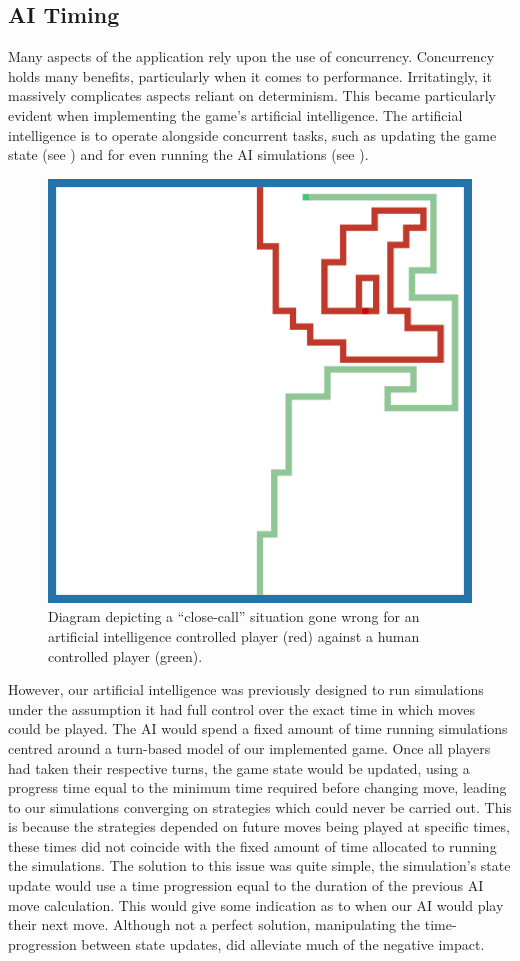 \documentclass{standalone}
\begin{document}
		\subsection{AI Timing} \label{sec:aiTiming}
			Many aspects of the application rely upon the use of concurrency. Concurrency holds many benefits, particularly when it comes to performance. Irritatingly, it massively complicates aspects reliant on determinism. This became particularly evident when implementing the game's artificial intelligence. The artificial intelligence is to operate alongside concurrent tasks, such as updating the game state (see ) and for even running the AI simulations (see ).

			\begin{figure}[!htbp]
				\centering
				\includegraphics[width=.8\textwidth]{resources/images/aiclosecall.png}
				\caption{Diagram depicting a \enquote{close-call} situation gone wrong for an artificial intelligence controlled player (red) against a human controlled player (green).}
			\end{figure}
			\FloatBarrier

			However, our artificial intelligence was previously designed to run simulations under the assumption it had full control over the exact time in which moves could be played. The AI would spend a fixed amount of time running simulations centred around a turn-based model of our implemented game. Once all players had taken their respective turns, the game state would be updated, using a progress time equal to the minimum time required before changing move, leading to our simulations converging on strategies which could never be carried out. This is because the strategies depended on future moves being played at specific times, these times did not coincide with the fixed amount of time allocated to running the simulations. The solution to this issue was quite simple, the simulation's state update would use a time progression equal to the duration of the previous AI move calculation. This would give some indication as to when our AI would play their next move. Although not a perfect solution, manipulating the time-progression between state updates, did alleviate much of the negative impact.
\end{document}
